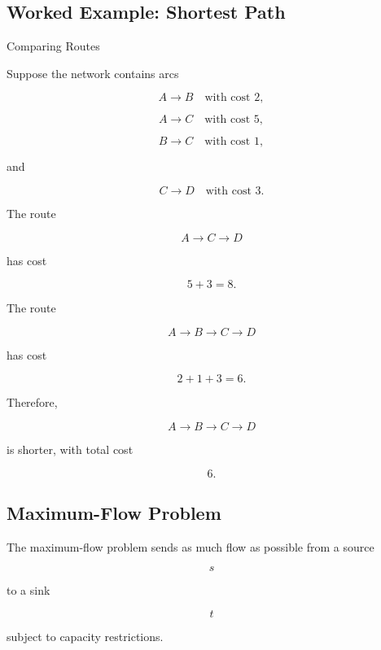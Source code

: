 \subsection{Worked Example: Shortest Path}
\label{subsec:worked-network-shortest-path}

\begin{workedexamplebox}{Comparing Routes}

Suppose the network contains arcs

\[
A\to B
\quad\text{with cost }2,
\]

\[
A\to C
\quad\text{with cost }5,
\]

\[
B\to C
\quad\text{with cost }1,
\]

and

\[
C\to D
\quad\text{with cost }3.
\]

The route

\[
A\to C\to D
\]

has cost

\[
5+3=8.
\]

The route

\[
A\to B\to C\to D
\]

has cost

\[
2+1+3=6.
\]

Therefore,

\begin{answerbox}
\[
\boxed{
A\to B\to C\to D
}
\]

is shorter, with total cost

\[
\boxed{
6.
}
\]
\end{answerbox}

\end{workedexamplebox}

\subsection{Maximum-Flow Problem}
\label{subsec:maximum-flow-problem}

The maximum-flow problem sends as much flow as possible from a source

\[
s
\]

to a sink

\[
t
\]

subject to capacity restrictions.

